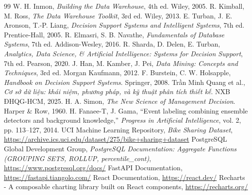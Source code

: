 \documentclass[a4paper,11pt]{article}
\begin{document}















\newpage
\renewcommand{\refname}{Tài liệu tham khảo}
\begin{thebibliography}{99}
   W. H. Inmon, \textit{Building the Data Warehouse}, 4th ed. Wiley, 2005.
   R. Kimball, M. Ross, \textit{The Data Warehouse Toolkit}, 3rd ed. Wiley, 2013.
   E. Turban, J. E. Aronson, T.-P. Liang, \textit{Decision Support Systems and Intelligent Systems}, 7th ed. Prentice-Hall, 2005.
   R. Elmasri, S. B. Navathe, \textit{Fundamentals of Database Systems}, 7th ed. Addison-Wesley, 2016.
   R. Sharda, D. Delen, E. Turban, \textit{Analytics, Data Science, \& Artificial Intelligence: Systems for Decision Support}, 7th ed. Pearson, 2020.
   J. Han, M. Kamber, J. Pei, \textit{Data Mining: Concepts and Techniques}, 3rd ed. Morgan Kaufmann, 2012.
   F. Burstein, C. W. Holsapple, \textit{Handbook on Decision Support Systems}. Springer, 2008.
   Trần Minh Quang et al., \textit{Cơ sở dữ liệu: khái niệm, phương pháp, và kỹ thuật phân tích thiết kế}. NXB ĐHQG-HCM, 2025.
   H. A. Simon, \textit{The New Science of Management Decision}. Harper \& Row, 1960.
   H. Fanaee-T, J. Gama, ``Event labeling combining ensemble detectors and background knowledge,'' \textit{Progress in Artificial Intelligence}, vol. 2, pp. 113--127, 2014.
   UCI Machine Learning Repository, \textit{Bike Sharing Dataset}, \url{https://archive.ics.uci.edu/dataset/275/bike+sharing+dataset}
   PostgreSQL Global Development Group, \textit{PostgreSQL Documentation: Aggregate Functions (GROUPING SETS, ROLLUP, percentile\_cont)}, \url{https://www.postgresql.org/docs/}
   FastAPI Documentation, \url{https://fastapi.tiangolo.com/}
   React Documentation, \url{https://react.dev/}
   Recharts - A composable charting library built on React components, \url{https://recharts.org/}
\end{thebibliography}
\end{document}
